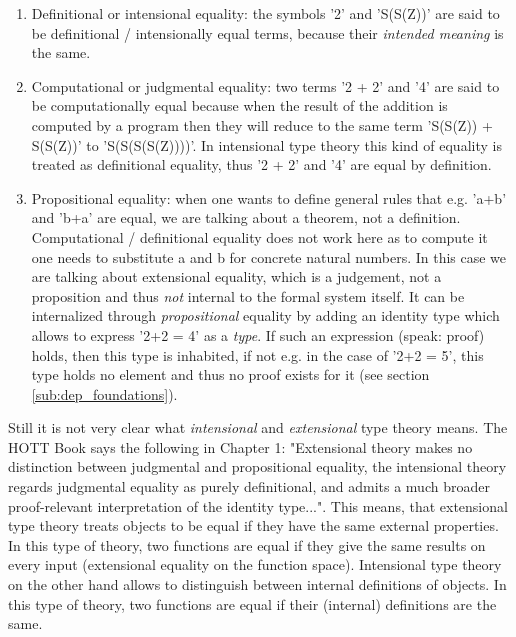 \begin{enumerate}
	\item Definitional or intensional equality: the symbols '2' and 'S(S(Z))' are said to be definitional / intensionally equal terms, because their \textit{intended meaning} is the same.
	\item Computational or judgmental equality: two terms '2 + 2' and '4' are said to be computationally equal because when the result of the addition is computed by a program then they will reduce to the same term 'S(S(Z)) + S(S(Z))' to 'S(S(S(S(Z))))'. In intensional type theory this kind of equality is treated as definitional equality, thus '2 + 2' and '4' are equal by definition.
	\item Propositional equality: when one wants to define general rules that e.g. 'a+b' and 'b+a' are equal, we are talking about a theorem, not a definition. Computational / definitional equality does not work here as to compute it one needs to substitute a and b for concrete natural numbers. In this case we are talking about extensional equality, which is a judgement, not a proposition and thus \textit{not} internal to the formal system itself. It can be internalized through \textit{propositional} equality by adding an identity type which allows to express '2+2 = 4' as a \textit{type}. If such an expression (speak: proof) holds, then this type is inhabited, if not e.g. in the case of '2+2 = 5', this type holds no element and thus no proof exists for it (see section \ref{sub:dep_foundations}).
\end{enumerate}

Still it is not very clear what \textit{intensional} and \textit{extensional} type theory means. The HOTT Book \cite{program_homotopy_2013} says the following in Chapter 1: "Extensional theory makes no distinction between judgmental and propositional equality, the intensional theory regards judgmental equality as purely definitional, and admits a much broader proof-relevant interpretation of the identity type...". This means, that extensional type theory treats objects to be equal if they have the same external properties. In this type of theory, two functions are equal if they give the same results on every input (extensional equality on the function space). Intensional type theory on the other hand allows to distinguish between internal definitions of objects. In this type of theory, two functions are equal if their (internal) definitions are the same.


